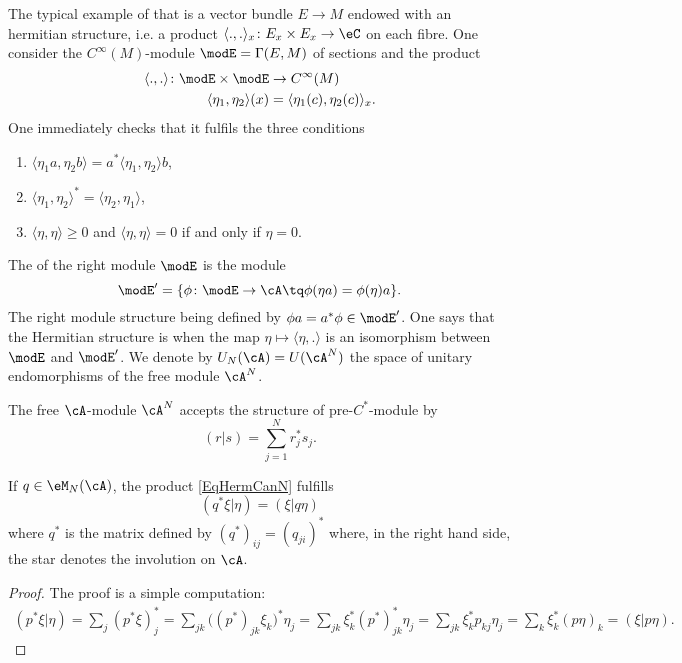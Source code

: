 The typical example of that is a vector bundle $E\to M$ endowed with an hermitian structure, i.e. a product $\langle ., .\rangle_x\colon E_x\times E_x\to \eC$ on each fibre. One consider the $ C^{\infty}(M)$-module $\modE=\Gamma(E,M)$ of sections and the product
\begin{equation}
	\begin{aligned}
		\langle ., .\rangle\colon \modE\times\modE & \to C^{\infty}(M)                        \\
		\langle \eta_1, \eta_2\rangle (x)          & = \langle \eta_1(c), \eta_2(c)\rangle_x.
	\end{aligned}
\end{equation}
One immediately checks that it fulfils the three conditions
\begin{enumerate}
	\item $\langle \eta_1a, \eta_2b\rangle= a^*\langle \eta_1, \eta_2\rangle b$,
	\item $\langle \eta_1, \eta_2\rangle^*=\langle \eta_2, \eta_1\rangle $,
	\item $\langle \eta, \eta\rangle \geq 0$ and $\langle \eta, \eta\rangle =0$ if and only if $\eta=0$.
\end{enumerate}

The  of the right module $\modE$ is the module
\[
	\modE'=\{ \phi\colon \modE\to \cA\tq \phi(\eta a)=\phi(\eta)a \}.
\]
The right module structure being defined by $\phi a=a^*\phi\in\modE'$. One says that the Hermitian structure is  when the map $\eta\mapsto\langle \eta, .\rangle $ is an isomorphism between $\modE$ and $\modE'$. We denote by $U_N(\cA)=U(\cA^N)$ the space of unitary endomorphisms of the free module $\cA^N$.

The free $\cA$-module $\cA^N$ accepts the structure of pre-$C^*$-module by
\begin{equation}	\label{EqHermCanN}
	(r|s) = \sum_{j=1}^N r^*_js_j.
\end{equation}

\begin{lemma}		\label{Lemqqstarherm}
	If $q\in\eM_N(\cA)$, the product \eqref{EqHermCanN} fulfills
	\[
		(q^*\xi|\eta)=(\xi|q\eta)
	\]
	where $q^*$ is the matrix defined by $(q^*)_{ij}=(q_{ji})^*$ where, in the right hand side, the star denotes the involution on $\cA$.
\end{lemma}

\begin{proof}
	The proof is a simple computation:
	\begin{align*}
		(p^*\xi|\eta)	=\sum_j(p^*\xi)_j^*
		=\sum_{jk}\big( (p^*)_{jk}\xi_k \big)^*\eta_j
		=\sum_{jk}\xi_k^*(p^*)_{jk}^*\eta_j
		=\sum_{jk}\xi^*_k p_{kj}\eta_j
		=\sum_k\xi_k^*(p\eta)_k
		=(\xi|p\eta).
	\end{align*}
\end{proof}

